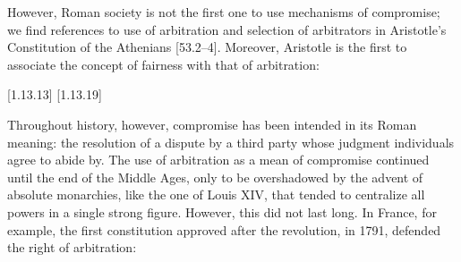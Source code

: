 However, Roman society is not the first one to use mechanisms of compromise; we find references to use of arbitration and selection of arbitrators in Aristotle’s Constitution of the Athenians [53.2–4]. %
Moreover, Aristotle is the first to associate the concept of fairness with that of arbitration:
%
\begin{displayquote}
\textit{}\citet{OnRhetoric}[1.13.13]
\textit{}\citet{OnRhetoric}[1.13.19]
\end{displayquote}
%
Throughout history, however, compromise has been intended in its Roman meaning: the resolution of a dispute by a third party whose judgment individuals agree to abide by.
The use of arbitration as a mean of compromise continued until the end of the Middle Ages, only to be overshadowed by the advent of absolute monarchies, like the one of Louis XIV, that tended to centralize all powers in a single strong figure.\citep{Zappala2018}
However, this did not last long. In France, for example, the first constitution approved after the revolution, in 1791, defended the right of arbitration:
%
\begin{displayquote}
\textit{}\citep{Constitution1791}
\end{displayquote}
%

